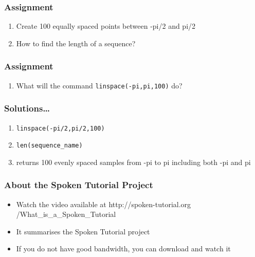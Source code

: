 \documentclass[17pt]{beamer}
\newcounter{saveenumi}
\newcommand{\seti}{\setcounter{saveenumi}{\value{enumi}}}
\newcommand{\conti}{\setcounter{enumi}{\value{saveenumi}}}
\begin{document}
\begin{frame}
\frametitle{Assignment}
\label{sec-7.1}
\begin{enumerate}
\item Create 100 equally spaced points between -pi/2 and pi/2\pause
\item How to find the length of a sequence?
	\seti
\end{enumerate}
\end{frame}
\begin{frame}
\frametitle{Assignment}
\label{sec-7.2}
\begin{enumerate}
	\conti
\item What will the command \texttt{linspace(-pi,pi,100)} do?\pause
\begin{itemize}
\end{itemize}
\end{enumerate}
\end{frame}
\begin{frame}
\frametitle{Solutions\ldots{}}
\label{sec-8}
\begin{enumerate}
\item \texttt{linspace(-pi/2,pi/2,100)}\pause
\item \texttt{len(sequence\_name)}\pause
\item returns 100 evenly spaced samples from -pi to pi including both -pi and pi
\end{enumerate}
\end{frame}
\begin{frame}
\frametitle{About the Spoken Tutorial Project}
\begin{itemize}
\item Watch the video available at {\color{blue}http://spoken-tutorial.org /What\_is\_a\_Spoken\_Tutorial}
\item It summarises the Spoken Tutorial project \pause
\item If you do not have good bandwidth, you can download and watch it
\end{itemize}
\end{frame}
\end{document}
